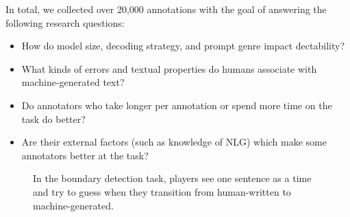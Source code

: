 In total, we collected over 20,000 annotations with the goal of answering the following research questions:
\begin{itemize}[itemsep=0.5pt,topsep=1pt]
    \item How do model size, decoding strategy, and prompt genre impact dectability?
    \item What kinds of errors and textual properties do humans associate with machine-generated text?
    \item Do annotators who take longer per annotation or spend more time on the task do better?
    \item Are their external factors (such as knowledge of NLG) which make some annotators better at the task?
\end{itemize}

\begin{figure}[t]
    \centering
    \caption{In the boundary detection task, players see one sentence as a time and try to guess when they transition from human-written to machine-generated.}
    \label{fig:pg1}
\end{figure}



